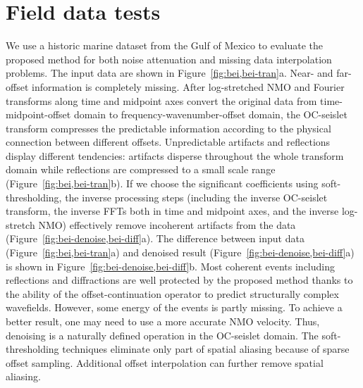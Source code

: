  \section{Field data tests} 

 We use a historic marine dataset from the Gulf of Mexico
 \cite[]{Claerbout08a} to evaluate the proposed method for both noise
 attenuation and missing data interpolation problems. The input data
 are shown in Figure~\ref{fig:bei,bei-tran}a. Near- and far- offset
 information is completely missing. After log-stretched NMO and
 Fourier transforms along time and midpoint axes convert the original
 data from time-midpoint-offset domain to frequency-wavenumber-offset
 domain, the OC-seislet transform compresses the predictable
 information according to the physical connection between different
 offsets. Unpredictable artifacts and reflections display different
 tendencies: artifacts disperse throughout the whole transform domain
 while reflections are compressed to a small scale range
 (Figure~\ref{fig:bei,bei-tran}b). If we choose the significant
 coefficients using soft-thresholding, the inverse processing steps
 (including the inverse OC-seislet transform, the inverse FFTs both in
 time and midpoint axes, and the inverse log-stretch NMO) effectively
 remove incoherent artifacts from the data
 (Figure~\ref{fig:bei-denoise,bei-diff}a). The difference between
 input data (Figure~\ref{fig:bei,bei-tran}a) and denoised result
 (Figure~\ref{fig:bei-denoise,bei-diff}a) is shown in
 Figure~\ref{fig:bei-denoise,bei-diff}b. Most coherent events
 including reflections and diffractions are well protected by the
 proposed method thanks to the ability of the offset-continuation
 operator to predict structurally complex wavefields. However, some
 energy of the events is partly missing. To achieve a better result,
 one may need to use a more accurate NMO velocity. Thus, denoising is
 a naturally defined operation in the OC-seislet domain. The
 soft-thresholding techniques eliminate only part of spatial aliasing
 because of sparse offset sampling. Additional offset interpolation
 can further remove spatial aliasing.



